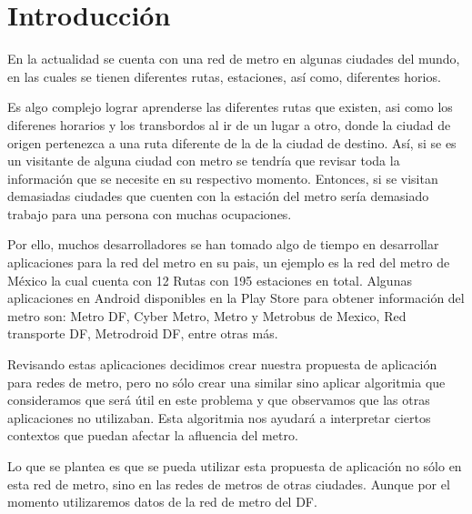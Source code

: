 \documentclass[12pt]{article} %
\begin{document}

\tableofcontents%

\newpage %


\section{Introducción} %

En la actualidad se cuenta con una red de metro en algunas ciudades del mundo, en las cuales se tienen diferentes rutas, estaciones, así como, diferentes horios. 

Es algo complejo lograr aprenderse las diferentes rutas que existen, asi como los diferenes horarios y los transbordos al ir de un lugar a otro, donde la ciudad de origen pertenezca a una ruta diferente de la de la ciudad de destino.
Así, si se es un visitante de alguna ciudad con metro se tendría que revisar toda la información que se necesite en su respectivo momento. Entonces, si se visitan demasiadas ciudades que cuenten con la estación del metro sería demasiado trabajo para una persona con muchas ocupaciones.

Por ello, muchos desarrolladores se han tomado algo de tiempo en desarrollar aplicaciones para la red del metro en su pais, un ejemplo es la red del metro de México la cual cuenta con 12 Rutas con 195 estaciones en total. Algunas aplicaciones en Android disponibles en la Play Store para obtener información del metro son: Metro DF, Cyber Metro, Metro y Metrobus de Mexico, Red transporte DF, Metrodroid DF, entre otras más.

Revisando estas aplicaciones decidimos crear nuestra propuesta de aplicación para redes de metro, pero no sólo crear una similar sino aplicar algoritmia que consideramos que será útil en este problema y que observamos que las otras aplicaciones no utilizaban. Esta algoritmia nos ayudará a interpretar ciertos contextos que puedan afectar la afluencia del metro.

Lo que se plantea es que se pueda utilizar esta propuesta de aplicación no sólo en esta red de metro, sino en las redes de metros de otras ciudades. Aunque por el momento utilizaremos datos de la red de metro del DF.
\pagebreak
\end{document}
